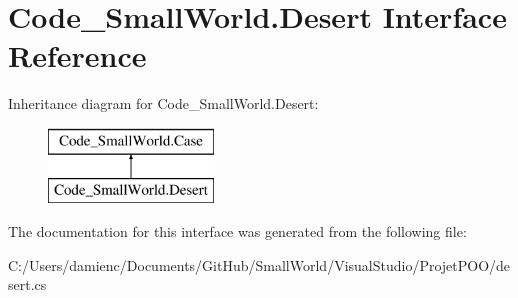 \hypertarget{interface_code___small_world_1_1_desert}{\section{Code\-\_\-\-Small\-World.\-Desert Interface Reference}
\label{interface_code___small_world_1_1_desert}
}
Inheritance diagram for Code\-\_\-\-Small\-World.\-Desert\-:\begin{figure}[H]
\begin{center}
\leavevmode
\includegraphics[height=2.000000cm]{interface_code___small_world_1_1_desert}
\end{center}
\end{figure}


The documentation for this interface was generated from the following file\-:\begin{DoxyCompactItemize}
\item 
C\-:/\-Users/damienc/\-Documents/\-Git\-Hub/\-Small\-World/\-Visual\-Studio/\-Projet\-P\-O\-O/desert.\-cs\end{DoxyCompactItemize}

